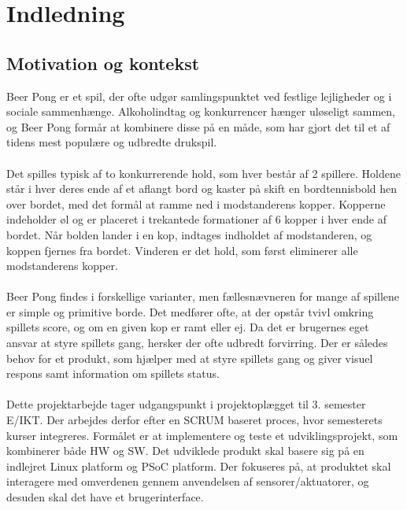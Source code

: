 \documentclass[Rapport/Rapport_main.tex]{subfiles}
\begin{document}
\section{Indledning}\label{sec:Indledning}
\subsection{Motivation og kontekst}
Beer Pong er et spil, der ofte udgør samlingspunktet ved festlige lejligheder og i sociale sammenhænge. Alkoholindtag og konkurrencer hænger uløseligt sammen, og Beer Pong formår at kombinere disse på en måde, som har gjort det til et af tidens mest populære og udbredte drukspil.\cite{drinking_research} \\\\Det spilles typisk af to konkurrerende hold, som hver består af 2 spillere. Holdene står i hver deres ende af et aflangt bord og kaster på skift en bordtennisbold hen over bordet, med det formål at ramme ned i modstanderens kopper. Kopperne indeholder øl og er placeret i trekantede formationer af 6 kopper i hver ende af bordet. Når bolden lander i en kop, indtages indholdet af modstanderen, og koppen fjernes fra bordet. Vinderen er det hold, som først eliminerer alle modstanderens kopper.\cite{beerpong_wiki}
\\\\Beer Pong findes i forskellige varianter, men fællesnævneren for mange af spillene er simple og primitive borde. Det medfører ofte, at der opstår tvivl omkring spillets score, og om en given kop er ramt eller ej. Da det er brugernes eget ansvar at styre spillets gang, hersker der ofte udbredt forvirring. Der er således behov for et produkt, som hjælper med at styre spillets gang og giver visuel respons samt information om spillets status.
\\\\Dette projektarbejde tager udgangspunkt i projektoplægget til 3. semester E/IKT\cite{Universitet2018}. Der arbejdes derfor efter en SCRUM baseret proces, hvor semesterets kurser integreres. Formålet er at implementere og teste et udviklingsprojekt, som kombinerer både HW og SW. Det udviklede produkt skal basere sig på en indlejret Linux platform og PSoC platform. Der fokuseres på, at produktet skal interagere med omverdenen gennem anvendelsen af sensorer/aktuatorer, og desuden skal det have et brugerinterface.
\end{document}
